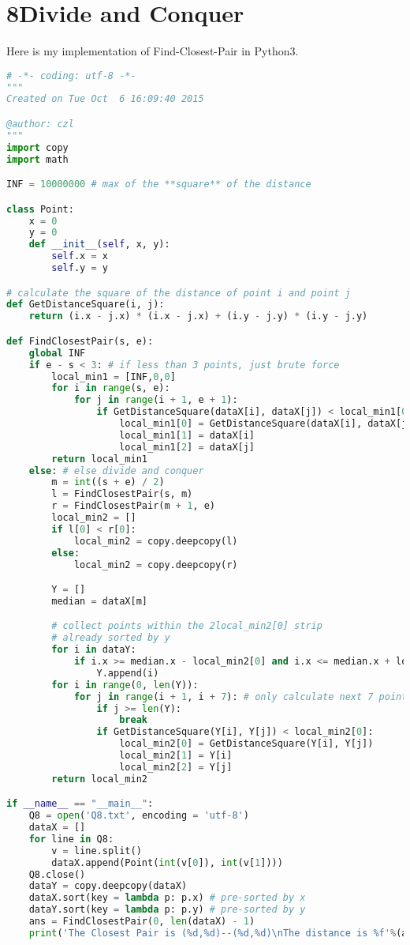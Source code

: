 \documentclass[a4paper,12pt]{article}
\begin{document}
\section*{8\quad Divide and Conquer}
Here is my implementation of Find-Closest-Pair in Python3.
\begin{lstlisting}[language=Python]
# -*- coding: utf-8 -*-
"""
Created on Tue Oct  6 16:09:40 2015

@author: czl
"""
import copy
import math

INF = 10000000 # max of the **square** of the distance

class Point:
	x = 0
	y = 0
	def __init__(self, x, y):
		self.x = x
		self.y = y

# calculate the square of the distance of point i and point j
def GetDistanceSquare(i, j):
	return (i.x - j.x) * (i.x - j.x) + (i.y - j.y) * (i.y - j.y)

def FindClosestPair(s, e):
    global INF
    if e - s < 3: # if less than 3 points, just brute force
        local_min1 = [INF,0,0]
        for i in range(s, e):
            for j in range(i + 1, e + 1):
                if GetDistanceSquare(dataX[i], dataX[j]) < local_min1[0]:
                    local_min1[0] = GetDistanceSquare(dataX[i], dataX[j])
                    local_min1[1] = dataX[i]
                    local_min1[2] = dataX[j]
        return local_min1
    else: # else divide and conquer
        m = int((s + e) / 2)
        l = FindClosestPair(s, m)
        r = FindClosestPair(m + 1, e)
        local_min2 = []
        if l[0] < r[0]:
            local_min2 = copy.deepcopy(l)
        else:
            local_min2 = copy.deepcopy(r)

        Y = []
        median = dataX[m]

        # collect points within the 2local_min2[0] strip
        # already sorted by y
        for i in dataY:
            if i.x >= median.x - local_min2[0] and i.x <= median.x + local_min2[0]:
                Y.append(i)
        for i in range(0, len(Y)):
            for j in range(i + 1, i + 7): # only calculate next 7 points
                if j >= len(Y):
                    break
                if GetDistanceSquare(Y[i], Y[j]) < local_min2[0]:
                    local_min2[0] = GetDistanceSquare(Y[i], Y[j])
                    local_min2[1] = Y[i]
                    local_min2[2] = Y[j]
        return local_min2

if __name__ == "__main__":
    Q8 = open('Q8.txt', encoding = 'utf-8')
    dataX = []
    for line in Q8:
        v = line.split()
        dataX.append(Point(int(v[0]), int(v[1])))
    Q8.close()
    dataY = copy.deepcopy(dataX)
    dataX.sort(key = lambda p: p.x) # pre-sorted by x
    dataY.sort(key = lambda p: p.y) # pre-sorted by y
    ans = FindClosestPair(0, len(dataX) - 1)
    print('The Closest Pair is (%d,%d)--(%d,%d)\nThe distance is %f'%(ans[1].x, ans[1].y, ans[2].x, ans[2].y, math.sqrt(ans[0])))
\end{lstlisting}
\end{document}
